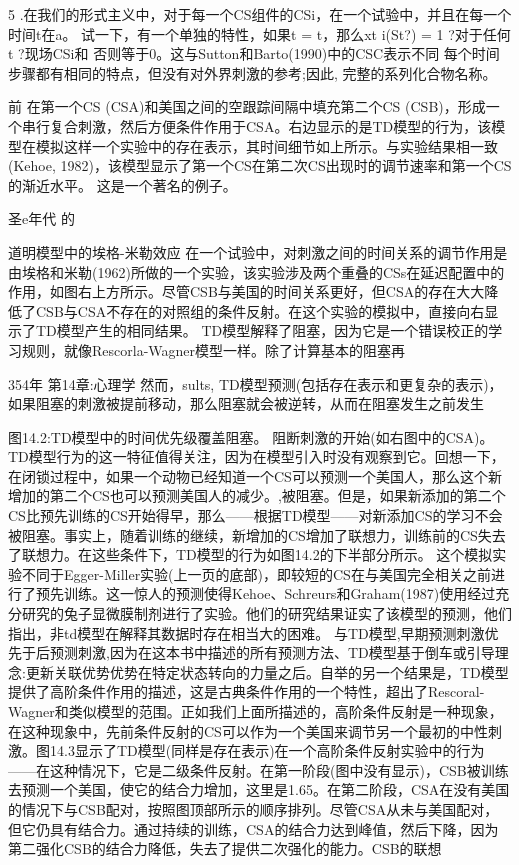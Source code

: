 5 .在我们的形式主义中，对于每一个CS组件的CSi，在一个试验中，并且在每一个时间t在a。
试一下，有一个单独的特性，如果t = t，那么xt i(St?) = 1 ?对于任何t ?现场CSi和
否则等于0。这与Sutton和Barto(1990)中的CSC表示不同
每个时间步骤都有相同的特点，但没有对外界刺激的参考;因此,
完整的系列化合物名称。

前
在第一个CS (CSA)和美国之间的空跟踪间隔中填充第二个CS (CSB)，形成一个串行复合刺激，然后方便条件作用于CSA。右边显示的是TD模型的行为，该模型在模拟这样一个实验中的存在表示，其时间细节如上所示。与实验结果相一致(Kehoe, 1982)，该模型显示了第一个CS在第二次CS出现时的调节速率和第一个CS的渐近水平。
这是一个著名的例子。

圣e年代
的


道明模型中的埃格-米勒效应
在一个试验中，对刺激之间的时间关系的调节作用是由埃格和米勒(1962)所做的一个实验，该实验涉及两个重叠的CSs在延迟配置中的作用，如图右上方所示。尽管CSB与美国的时间关系更好，但CSA的存在大大降低了CSB与CSA不存在的对照组的条件反射。在这个实验的模拟中，直接向右显示了TD模型产生的相同结果。
TD模型解释了阻塞，因为它是一个错误校正的学习规则，就像Rescorla-Wagner模型一样。除了计算基本的阻塞再

354年	第14章:心理学
然而，sults, TD模型预测(包括存在表示和更复杂的表示)，如果阻塞的刺激被提前移动，那么阻塞就会被逆转，从而在阻塞发生之前发生

图14.2:TD模型中的时间优先级覆盖阻塞。
阻断刺激的开始(如右图中的CSA)。TD模型行为的这一特征值得关注，因为在模型引入时没有观察到它。回想一下，在闭锁过程中，如果一个动物已经知道一个CS可以预测一个美国人，那么这个新增加的第二个CS也可以预测美国人的减少。,被阻塞。但是，如果新添加的第二个CS比预先训练的CS开始得早，那么——根据TD模型——对新添加CS的学习不会被阻塞。事实上，随着训练的继续，新增加的CS增加了联想力，训练前的CS失去了联想力。在这些条件下，TD模型的行为如图14.2的下半部分所示。
这个模拟实验不同于Egger-Miller实验(上一页的底部)，即较短的CS在与美国完全相关之前进行了预先训练。这一惊人的预测使得Kehoe、Schreurs和Graham(1987)使用经过充分研究的兔子显微膜制剂进行了实验。他们的研究结果证实了该模型的预测，他们指出，非td模型在解释其数据时存在相当大的困难。
与TD模型,早期预测刺激优先于后预测刺激,因为在这本书中描述的所有预测方法、TD模型基于倒车或引导理念:更新关联优势优势在特定状态转向的力量之后。自举的另一个结果是，TD模型提供了高阶条件作用的描述，这是古典条件作用的一个特性，超出了Rescoral-Wagner和类似模型的范围。正如我们上面所描述的，高阶条件反射是一种现象，在这种现象中，先前条件反射的CS可以作为一个美国来调节另一个最初的中性刺激。图14.3显示了TD模型(同样是存在表示)在一个高阶条件反射实验中的行为——在这种情况下，它是二级条件反射。在第一阶段(图中没有显示)，CSB被训练去预测一个美国，使它的结合力增加，这里是1.65。在第二阶段，CSA在没有美国的情况下与CSB配对，按照图顶部所示的顺序排列。尽管CSA从未与美国配对，但它仍具有结合力。通过持续的训练，CSA的结合力达到峰值，然后下降，因为第二强化CSB的结合力降低，失去了提供二次强化的能力。CSB的联想


